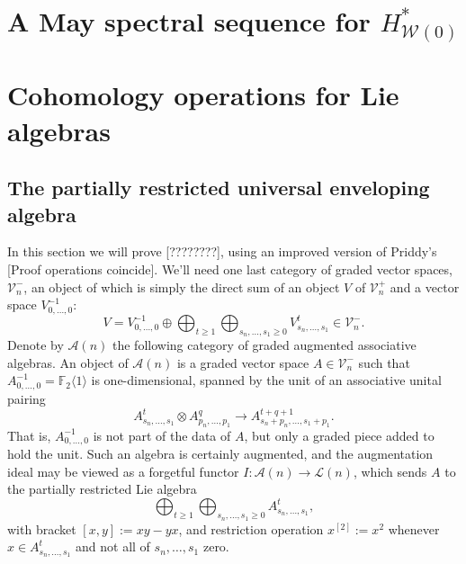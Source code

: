 \documentclass[11pt]{amsart}
\theoremstyle{plain}
\theoremstyle{definition}
\renewcommand{\to}{\longrightarrow}
\newcommand{\calW}{\mathcal{W}}
\newcommand{\calA}{\mathcal{A}}
\newcommand{\calL}{\mathcal{L}}
\newcommand{\calV}{\mathcal{V}}
\theoremstyle{plain}
\newcommand{\restn}[1]{#1^{[2]}}
\newcommand{\vect}[2]{\calV^{#1}_{#2}}
\newcommand{\F}{\mathbb{F}}
\begin{document}
\appendix
\begin{appendices}
\vfil\pagebreak

\section{A May spectral sequence for $H^*_{\calW(0)}$}

\section{Cohomology operations for Lie algebras}\label{appendix on Lie coh ops}
\subsection{The partially restricted universal enveloping algebra}
In this section we will prove [????????], using an improved version of Priddy's [Proof operations coincide]. We'll need one last category of graded vector spaces, $\vect{-}{n}$, an object of which is simply the direct sum of an object $V$ of $\vect{+}{n}$ and a vector space $V_{0,\ldots,0}^{-1}$:
\[V=V^{-1}_{0,\ldots,0}\oplus\bigoplus_{t\geq{1}}\bigoplus_{s_n,\ldots,s_1\geq0}V^t_{s_n,\ldots,s_1}\in\vect{-}{n}.\]
Denote by $\calA(n)$ the following category of graded augmented associative algebras. An object of $\calA(n)$ is a graded vector space
$A\in \vect{-}{n}$ such that $A^{-1}_{0,\ldots,0}=\F_2\langle 1\rangle$ is one-dimensional, spanned by the unit of an associative unital pairing
\[A^{t}_{s_n,\ldots,s_1}\otimes A^{q}_{p_n,\ldots,p_1}\to A^{t+q+1}_{s_n+p_n,\ldots,s_1+p_1}.\]
That is, $A_{0,\ldots,0}^{-1}$ is not part of the data of $A$, but only a graded piece added to hold the unit. Such an algebra is certainly augmented, and the augmentation ideal may be viewed as a forgetful functor $I:\calA(n)\to\calL(n)$, which sends $A$ to the partially restricted Lie algebra
\[\bigoplus_{t\geq{1}}\bigoplus_{s_n,\ldots,s_1\geq0}A^t_{s_n,\ldots,s_1},\]
with bracket $[x,y]:=xy-yx$, and restriction operation $\restn{x}:=x^2$ whenever $x\in A^t_{s_n,\ldots,s_1}$ and not all of $s_n,\ldots,s_1$ zero.


\end{appendices}
\end{document}
